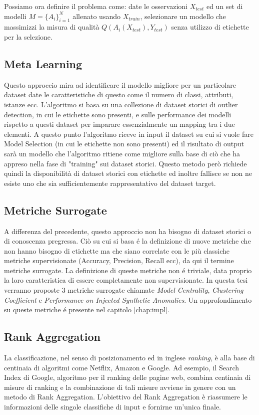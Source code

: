 Possiamo ora definire il problema come: date le osservazioni \(X_{test}\) ed un set di modelli \(M=\{A_i\}^N_{i=1}\) allenato usando \(X_{train}\), selezionare un modello che massimizzi la misura di qualità \(Q(A_i(X_{test}),Y_{test})\) senza utilizzo di etichette per la selezione.

\subsection{Meta Learning}
Questo approccio mira ad identificare il modello migliore per un particolare dataset date le caratteristiche di questo come il numero di classi, attributi, istanze ecc. L'algoritmo si basa su una collezione di dataset storici di outlier detection, in cui le etichette sono presenti, e sulle performance dei modelli rispetto a questi dataset per imparare essenzialmente un mapping tra i due elementi. 
A questo punto l'algoritmo riceve in input il dataset su cui si vuole fare Model Selection (in cui le etichette non sono presenti) ed il risultato di output sarà un modello che l'algoritmo ritiene come migliore sulla base di ciò che ha appreso nella fase di "training" sui dataset storici.
Questo metodo però richiede quindi la disponibilità di dataset storici con etichette ed inoltre fallisce se non ne esiste uno che sia sufficientemente rappresentativo del dataset target.
\subsection{Metriche Surrogate}
A differenza del precedente, questo approccio non ha bisogno di dataset storici o di conoscenza pregressa. Ciò su cui si basa é la definizione di nuove metriche che non hanno bisogno di etichette ma che siano correlate con le più classiche metriche supervisionate (Accuracy, Precision, Recall ecc), da qui il termine metriche surrogate.
La definizione di queste metriche non é triviale, data proprio la loro caratteristica di essere completamente non supervisionate. In questa tesi verranno proposte 3 metriche surrogate chiamate \textit{Model Centrality}, \textit{Clustering Coefficient} e \textit{Performance on Injected Synthetic Anomalies}. Un approfondimento su queste metriche é presente nel capitolo \ref{chap:impl}.


\subsection{Rank Aggregation}
La classificazione, nel senso di posizionamento ed in inglese \textit{ranking}, è alla base di centinaia di algoritmi come Netflix, Amazon e Google. 
Ad esempio, il Search Index di Google, algoritmo per il ranking delle pagine web, combina centinaia di misure di ranking e la combinazione di tali misure avviene in genere con un metodo di Rank Aggregation. 
L'obiettivo del Rank Aggregation è riassumere le informazioni delle singole classifiche di input e fornirne un'unica finale. 

